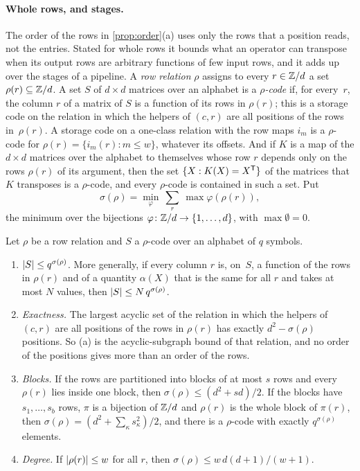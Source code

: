 \paragraph{Whole rows, and stages.} The order of the rows in \cref{prop:order}(a) uses only the rows that a position
reads, not the entries. Stated for whole rows it bounds what an operator can transpose when its output rows are
arbitrary functions of few input rows, and it adds up over the stages of a pipeline. A \emph{row relation} $\rho$
assigns to every $r\in\mathbb{Z}/d$ a set $\rho(r)\subseteq\mathbb{Z}/d$. A set $S$ of $d\times d$ matrices over an alphabet is a
\emph{$\rho$-code} if, for every~$r$, the column $r$ of a matrix of $S$ is a function of its rows in $\rho(r)$; this is
a storage code on the relation in which the helpers of $(c,r)$ are all positions of the rows in~$\rho(r)$. A storage
code on a one-class relation with the row maps $i_m$ is a $\rho$-code for $\rho(r)=\{i_m(r):m\le w\}$, whatever its
offsets. And if $K$ is a map of the $d\times d$ matrices over the alphabet to themselves whose row $r$ depends only on
the rows $\rho(r)$ of its argument, then the set $\{X:K(X)=X^{\mathsf{T}}\}$ of the matrices that $K$ transposes is a $\rho$-code,
and every $\rho$-code is contained in such a set. Put
\[
  \sigma(\rho)=\min_\varphi\ \sum_r\ \max\varphi(\rho(r)),
\]
the minimum over the bijections $\varphi\colon\mathbb{Z}/d\to\{1,\dots,d\}$, with $\max\emptyset=0$.

\begin{proposition}\label{prop:rows}
\notformalized
Let $\rho$ be a row relation and $S$ a $\rho$-code over an alphabet of $q$ symbols.
\begin{enumerate}[label=(\alph*),leftmargin=2em]
\item $\lvert S \rvert\le q^{\sigma(\rho)}$. More generally, if every column $r$ is, on~$S$, a function of the rows in
$\rho(r)$ and of a quantity $\alpha(X)$ that is the same for all $r$ and takes at most $N$ values, then
$\lvert S \rvert\le N\,q^{\sigma(\rho)}$.
\item \emph{Exactness.} The largest acyclic set of the relation in which the helpers of $(c,r)$ are all positions
of the rows in $\rho(r)$ has exactly $d^2-\sigma(\rho)$ positions. So (a) is the acyclic-subgraph bound of that
relation, and no order of the positions gives more than an order of the rows.
\item \emph{Blocks.} If the rows are partitioned into blocks of at most $s$ rows and every $\rho(r)$ lies inside one
block, then $\sigma(\rho)\le(d^2+sd)/2$. If the blocks have $s_1,\dots,s_b$ rows, $\pi$ is a bijection of $\mathbb{Z}/d$ and
$\rho(r)$ is the whole block of $\pi(r)$, then $\sigma(\rho)=(d^2+\sum_\kappa s_\kappa^2)/2$, and there is a
$\rho$-code with exactly $q^{\sigma(\rho)}$ elements.
\item \emph{Degree.} If $\lvert \rho(r) \rvert\le w$ for all $r$, then $\sigma(\rho)\le w\,d(d+1)/(w+1)$.
\end{enumerate}
\end{proposition}

